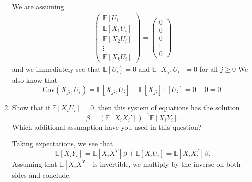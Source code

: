 \documentclass[11pt]{article}
\newcommand{\Cov}{\text{Cov}}
\newcommand{\bbE}{\mathbb{E}}
\begin{document}
\begin{enumerate}[label=(\alph*)]
    \begin{solution}
        We are assuming 
        \begin{align*}
            \begin{pmatrix}
                \bbE[U_i]\\
                \bbE[X_1 U_i]\\
                \bbE[X_2 U_i]\\
                \vdots\\
                \bbE[X_k U_i]
            \end{pmatrix} = \begin{pmatrix}
                0\\0\\0\\\vdots\\0
            \end{pmatrix}
        \end{align*}
        and we immediately see that $\bbE[U_i] = 0$ and $\bbE[X_{j}, U_i] = 0$ for all $j\geq 0$  We also know that 
        \[\Cov(X_{ji}, U_i) = \bbE[X_{ji}, U_i] - \bbE[X_{ji}]\bbE[U_i] = 0 - 0 = 0.\]
    \end{solution}
    
    \item Show that if \( \mathbb{E}[X_i U_i] = 0 \), then this system of equations has the solution
    \[
    \beta = \left( \mathbb{E}[X_i X_i'] \right)^{-1} \mathbb{E}[X_i Y_i].
    \]
    Which additional assumption have you used in this question?
    \begin{solution}
        Taking expectations, we see that 
        \[\bbE[X_i Y_i] = \bbE[X_i X^T]\beta + \bbE[X_i U_i] = \bbE[X_i X_i^T]\beta.\] Assuming that $\bbE[X_iX^T]$ is invertible, we multiply by the inverse on both sides and conclude.
    \end{solution}
\end{enumerate}





    
\end{document}
